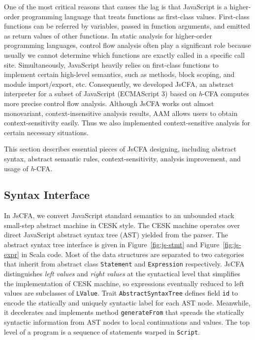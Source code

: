 \documentclass{article}
\begin{document}
One of the most critical reasons that causes the lag is that JavaScript is a higher-order programming language that treats functions as first-class values. First-class functions can be referred by variables, passed in function arguments, and emitted as return values of other  functions.
In static analysis for higher-order programming languages, control flow analysis often play a significant role because usually we cannot determine which functions are exactly called in a specific call site.
Simultaneously, JavaScript heavily relies on first-class functions to implement certain high-level semantics, such as methods, block scoping, and module import/export, etc.
Consequently, we developed JsCFA, an abstract interpreter for a subset of JavaScript (ECMAScript 3) based on \textit{h}-CFA computes more precise control flow analysis.
Although JsCFA works out almost monovariant, context-insensitive analysis results, AAM allows users to obtain context-sensitivity easily.
Thus we also implemented context-sensitive analysis for certain necessary situations.

This section describes essential pieces of JsCFA designing, including abstract syntax, abstract semantic rules, context-sensitivity, analysis improvement, and usage of \textit{h}-CFA\@.

\subsection{Syntax Interface}
\label{sub:Syntax}

In JsCFA, we convert JavaScript standard semantics to an unbounded stack small-step abstract machine in CESK style.
The CESK machine operates over direct JavaScript abstract syntax tree (AST) yielded from the parser.
 The abstract syntax tree interface is given in Figure~\ref{fig:js-stmt} and Figure~\ref{fig:js-expr} in Scala code.
Most of the data structures are separated to two categories that inherit from abstract class \verb|Statement| and \verb|Expression| respectively.
JsCFA distinguishes \emph{left values} and \emph{right values} at the syntactical level that simplifies the implementation of CESK machine, so expressions eventually reduced to left values are subclasses of \verb|LValue|.
Trait \verb|AbstractSyntaxTree| defines field \verb|id| to encode the statically and uniquely syntactic label for each AST node. Meanwhile, it decelerates and implements method \verb|generateFrom| that spreads the statically syntactic information from AST nodes to local continuations and values.
The top level of a program is a sequence of statements warped in \verb|Script|.
\end{document}
